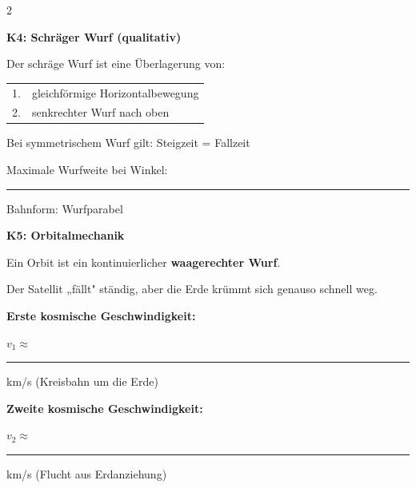 \documentclass[10pt, a4paper]{article}
\newcommand{\fachfarbe}{physik}
\newcommand{\luecke}[1]{\rule{#1}{0.4pt}}
\newcommand{\abschnitt}[1]{%
    \vspace{4pt}
    \noindent\textbf{\textcolor{\fachfarbe}{#1}}
    \vspace{2pt}
}
\begin{document}
\begin{multicols}{2}
\small


\abschnitt{K4: Schräger Wurf (qualitativ)}

\begin{merkbox}
Der schräge Wurf ist eine Überlagerung von:

\vspace{4pt}
\begin{tabular}{@{}rl@{}}
1. & gleichförmige Horizontalbewegung \\[6pt]
2. & senkrechter Wurf nach oben \\
\end{tabular}

\vspace{8pt}
Bei symmetrischem Wurf gilt: Steigzeit = Fallzeit

\vspace{8pt}
Maximale Wurfweite bei Winkel: \luecke{1.5cm}

\vspace{8pt}
Bahnform: Wurfparabel
\end{merkbox}

\vspace{4pt}


\abschnitt{K5: Orbitalmechanik}

\begin{merkbox}
Ein Orbit ist ein kontinuierlicher \textbf{waagerechter Wurf}.

Der Satellit „fällt" ständig, aber die Erde krümmt sich genauso schnell weg.

\vspace{8pt}
\textbf{Erste kosmische Geschwindigkeit:}

$v_1 \approx$ \luecke{1.5cm} km/s \quad (Kreisbahn um die Erde)

\vspace{6pt}
\textbf{Zweite kosmische Geschwindigkeit:}

$v_2 \approx$ \luecke{1.5cm} km/s \quad (Flucht aus Erdanziehung)
\end{merkbox}

\columnbreak



\end{multicols}
\end{document}
